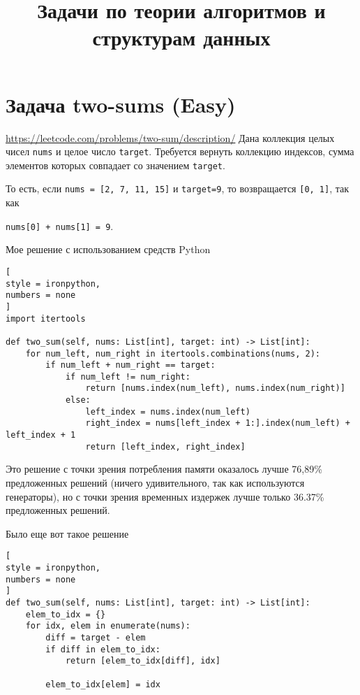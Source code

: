 \documentclass[%
	11pt,
	a4paper,
	utf8,
		]{article}
\begin{document}
\title{Задачи по теории алгоритмов и структурам данных}

\author{}

\date{}
\maketitle

\thispagestyle{fancy}

\tableofcontents

\section{Задача two-sums (Easy)}

\url{https://leetcode.com/problems/two-sum/description/} Дана коллекция целых чисел \verb|nums| и целое число \verb|target|. Требуется вернуть коллекцию индексов, сумма элементов которых совпадает со значением \verb|target|.

То есть, если \verb|nums = [2, 7, 11, 15]| и \verb|target=9|, то возвращается \verb|[0, 1]|, так как 

\verb|nums[0] + nums[1] = 9|.

Мое решение с использованием средств Python
\begin{lstlisting}[
style = ironpython,
numbers = none
]
import itertools

def two_sum(self, nums: List[int], target: int) -> List[int]:
	for num_left, num_right in itertools.combinations(nums, 2):
		if num_left + num_right == target:
			if num_left != num_right:
				return [nums.index(num_left), nums.index(num_right)]
			else:
				left_index = nums.index(num_left)
				right_index = nums[left_index + 1:].index(num_left) + left_index + 1
				return [left_index, right_index]
\end{lstlisting}

Это решение с точки зрения потребления памяти оказалось лучше 76,89\% предложенных решений (ничего удивительного, так как используются генераторы), но с точки зрения временных издержек лучше только 36.37\% предложенных решений.

Было еще вот такое решение
\begin{lstlisting}[
style = ironpython,
numbers = none
]
def two_sum(self, nums: List[int], target: int) -> List[int]:
	elem_to_idx = {}
	for idx, elem in enumerate(nums):
		diff = target - elem
		if diff in elem_to_idx:
			return [elem_to_idx[diff], idx]
			
		elem_to_idx[elem] = idx
\end{lstlisting}
\end{document}
